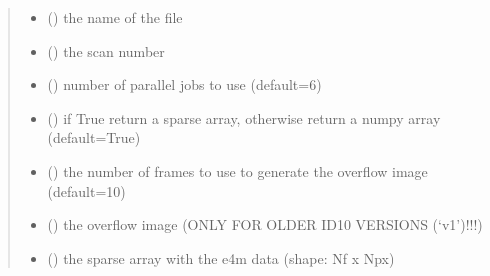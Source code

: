 \documentclass[letterpaper,10pt,english]{sphinxmanual}
\begin{document}
\begin{fulllineitems}
\begin{quote}
\begin{description}
\begin{itemize}
\item {} 
\sphinxAtStartPar
{} () \textendash{} the name of the file

\item {} 
\sphinxAtStartPar
{} () \textendash{} the scan number

\item {} 
\sphinxAtStartPar
{} () \textendash{} number of parallel jobs to use (default=6)

\item {} 
\sphinxAtStartPar
{} () \textendash{} if True return a sparse array, otherwise return a numpy array (default=True)

\item {} 
\sphinxAtStartPar
{} () \textendash{} the number of frames to use to generate the overflow image (default=10)

\end{itemize}

\sphinxAtStartPar
\begin{itemize}
\item {} 
\sphinxAtStartPar
{} () \textendash{} the overflow image (ONLY FOR OLDER ID10 VERSIONS (‘v1’)!!!)

\item {} 
\sphinxAtStartPar
{} () \textendash{} the sparse array with the e4m data (shape: Nf x Npx)

\end{itemize}


\end{description}\end{quote}

\end{fulllineitems}

\end{document}
